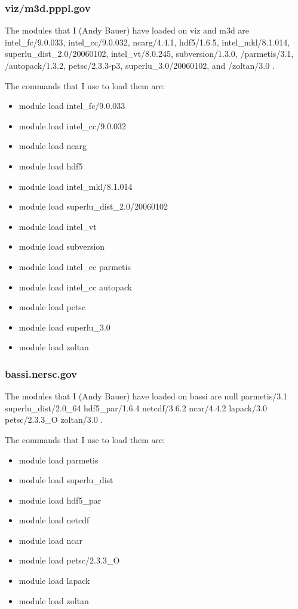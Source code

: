 \subsubsection{viz/m3d.pppl.gov}
The modules that I (Andy Bauer) have loaded on viz and m3d are  
 intel\_fc/9.0.033,
 intel\_cc/9.0.032,
 ncarg/4.4.1,
 hdf5/1.6.5,
 intel\_mkl/8.1.014,
   superlu\_dist\_2.0/20060102,
   intel\_vt/8.0.245,
   subversion/1.3.0,
   /parmetis/3.1,
  /autopack/1.3.2,
  petsc/2.3.3-p3,
  superlu\_3.0/20060102, and
  /zoltan/3.0 .

The commands that I use to load them are:
\begin{itemize}
\item      module load intel\_fc/9.0.033
\item       module load intel\_cc/9.0.032
\item       module load ncarg
\item       module load hdf5
\item       module load intel\_mkl/8.1.014
\item       module load superlu\_dist\_2.0/20060102
\item       module load intel\_vt
\item       module load subversion
\item       module load intel\_cc parmetis
\item       module load intel\_cc autopack
\item       module load petsc
\item       module load superlu\_3.0
\item       module load zoltan
\end{itemize}

\subsubsection{bassi.nersc.gov}
The modules that I (Andy Bauer) have loaded on bassi are 
null
   parmetis/3.1
   superlu\_dist/2.0\_64
   hdf5\_par/1.6.4
   netcdf/3.6.2
   ncar/4.4.2
   lapack/3.0
   petsc/2.3.3\_O
   zoltan/3.0 .

The commands that I use to load them are:
\begin{itemize}
\item module load parmetis
\item module load superlu\_dist
\item module load hdf5\_par
\item module load netcdf
\item module load ncar
\item module load petsc/2.3.3\_O
\item module load lapack
\item module load zoltan
\end{itemize}

